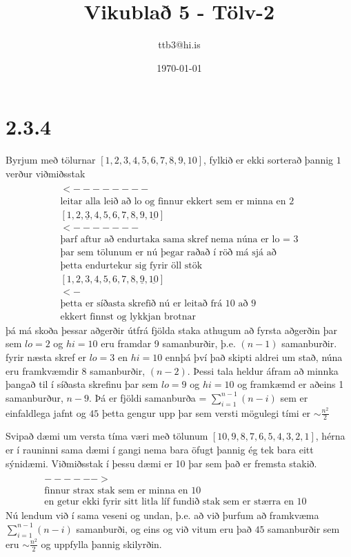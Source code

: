 \documentclass{article}
\title{Vikublað 5 - Tölv-2}
\author{ttb3@hi.is}
\date{\today}
\begin{document}
\maketitle

\section*{2.3.4}
Byrjum með tölurnar $[1,2,3,4,5,6,7,8,9,10]$, fylkið er ekki sorterað þannig $1$ verður viðmiðsstak
\begin{align*}
    [1,\underline{2},3,4,5,6,7,8,9,\underline{10}]\\
    <--------\\
    \text{leitar alla leið að lo og finnur ekkert sem er minna en 2}\\
    [1,2,\underline{3},4,5,6,7,8,9,\underline{10}]\\
    <-------\\
    \text{þarf aftur að endurtaka sama skref nema núna er lo = 3}\\
    \text{þar sem tölunum er nú þegar raðað í röð má sjá að}\\
    \text{þetta endurtekur sig fyrir öll stök}\\
    [1,2,3,4,5,6,7,8,\underline{9},\underline{10}]\\
    <-\\
    \text{þetta er síðasta skrefið nú er leitað frá 10 að 9}\\
    \text{ekkert finnst og lykkjan brotnar}
\end{align*}
þá má skoða þessar aðgerðir útfrá fjölda staka athugum að fyrsta aðgerðin þar sem $lo=2$ og $hi=10$ eru framdar 9 samanburðir, þ.e. $(n-1)$ samanburðir.
fyrir næsta skref er $lo=3$ en $hi=10$ ennþá því það skipti aldrei um stað, núna eru framkvæmdir 8 samanburðir, $(n-2)$.
Þessi tala heldur áfram að minnka þangað til í síðasta skrefinu þar sem $lo=9$ og $hi=10$ og framkæmd er aðeins 1 samanburður, $n-9$.
Þá er fjöldi samanburða = $\sum_{i=1}^{n-1}(n-i)$ sem er einfaldlega jafnt og $45$ þetta gengur upp þar sem versti mögulegi tími er $\sim\frac{n^2}{2}$


Svipað dæmi um versta tíma væri með tölunum $[10,9,8,7,6,5,4,3,2,1]$,
hérna er í rauninni sama dæmi í gangi nema bara öfugt þannig ég tek bara eitt sýnidæmi.
Viðmiðsstak í þessu dæmi er 10 þar sem það er fremsta stakið.
\begin{align*}
    [10,\underline{9},8,7,6,5,4,3,2&,\underline{1}]\\
    ------>&\\
    \text{finnur strax stak sem er minna en 10}\\ 
    \text{en getur ekki fyrir sitt litla líf fundið stak sem er stærra en 10}
\end{align*}
Nú lendum við í sama veseni og undan, þ.e. að við þurfum að framkvæma $\sum_{i=1}^{n-1}(n-i)$ samanburði, og eins og við vitum eru það $45$ samanburðir sem eru $\sim\frac{n^2}{2}$ og uppfylla þannig skilyrðin.
\end{document}
